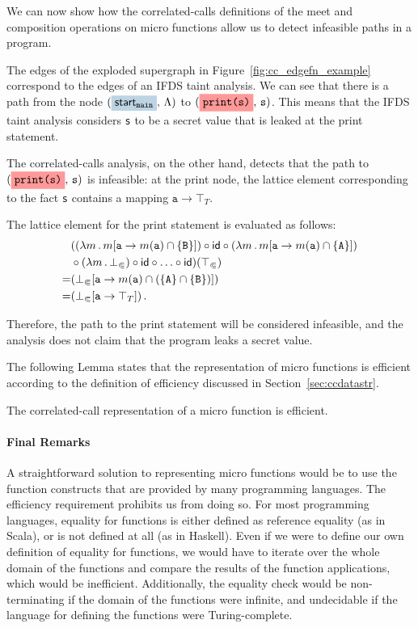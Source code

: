 We can now show how the correlated-calls definitions of the meet and composition operations on micro functions allow us to detect infeasible paths in a program.
\begin{example}\label{ex:cc}
  The edges of the exploded supergraph in Figure~\ref{fig:cc_edgefn_example} correspond to the edges of an IFDS taint analysis. We can see that there is a path from the node $(\highlight{\startmain}{greyblue},\,\Lambda)$ to $(\highlight{\texttt{print(s)}}{lightsalmonpink},\,\texttt s)$. This means that the IFDS taint analysis considers \texttt s to be a secret value that is leaked at the print statement.
  
  The correlated-calls analysis, on the other hand, detects that the path to $(\highlight{\texttt{print(s)}}{lightsalmonpink},\,\texttt s)$ is infeasible: at the print node, the lattice element corresponding to the fact \verb's' contains a mapping $\texttt a\to\top_T$.
  
  The lattice element for the print statement is evaluated as follows:
  \begin{align*}
    &((\lambda m\,.\,m[\texttt a\to m(\texttt a)\cap\{\texttt B\}])\circ
    \textsf{id}\circ
    (\lambda m\,.\,m[\texttt a\to m(\texttt a)\cap\{\texttt A\}])\\
    &\circ
    (\lambda m\,.\,\bot_\Subset)\circ
    \textsf{id}\circ\ldots\circ\textsf{id})(\top_\Subset)
    \\
    =&(\bot_\Subset[\texttt a\to m(\texttt a)\cap(\{\texttt A\}\cap\{\texttt B\})])
    \\
    =&(\bot_\Subset[\texttt a\to\top_T])\,.
  \end{align*}
  
  Therefore, the path to the print statement will be considered infeasible, and the analysis does not claim that the program leaks a secret value.
\end{example}

The following Lemma states that the representation of micro functions is efficient according to the definition  of efficiency discussed in Section~\ref{sec:ccdatastr}.
\begin{lemma}\label{lem:efficient}
  The correlated-call representation of a micro function is efficient.
\end{lemma}

\paragraph{Final Remarks}

A straightforward solution to representing micro functions would be to use the function constructs that are provided by many programming languages. The efficiency requirement prohibits us from doing so.
For most programming languages, equality for functions is either defined as reference equality (as in Scala), or is not defined at all (as in Haskell). Even if we were to define our own definition of equality for functions, we would have to iterate over the whole domain of the functions and compare the results of the function applications, which would be inefficient. Additionally, the equality check would be non-terminating if the domain of the functions were infinite, and undecidable if the language for defining the functions were Turing-complete.

